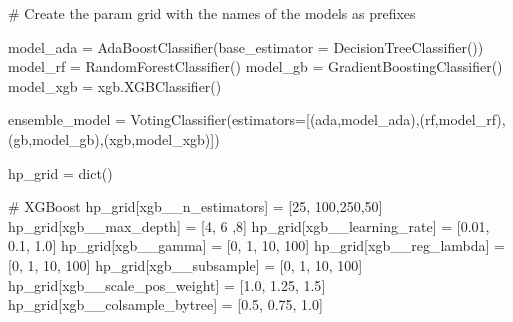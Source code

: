 \documentclass[
  letterpaper,
  DIV=11,
  numbers=noendperiod]{scrreprt}
\newenvironment{Shaded}{\begin{snugshade}}{\end{snugshade}}
\newcommand{\BuiltInTok}[1]{\textcolor[rgb]{0.00,0.23,0.31}{#1}}
\newcommand{\CommentTok}[1]{\textcolor[rgb]{0.37,0.37,0.37}{#1}}
\newcommand{\DecValTok}[1]{\textcolor[rgb]{0.68,0.00,0.00}{#1}}
\newcommand{\FloatTok}[1]{\textcolor[rgb]{0.68,0.00,0.00}{#1}}
\newcommand{\NormalTok}[1]{\textcolor[rgb]{0.00,0.23,0.31}{#1}}
\newcommand{\OperatorTok}[1]{\textcolor[rgb]{0.37,0.37,0.37}{#1}}
\newcommand{\StringTok}[1]{\textcolor[rgb]{0.13,0.47,0.30}{#1}}
\begin{document}
\begin{Shaded}
\begin{Highlighting}[]
\CommentTok{\# Create the param grid with the names of the models as prefixes}

\NormalTok{model\_ada }\OperatorTok{=}\NormalTok{ AdaBoostClassifier(base\_estimator }\OperatorTok{=}\NormalTok{ DecisionTreeClassifier())}
\NormalTok{model\_rf }\OperatorTok{=}\NormalTok{ RandomForestClassifier()}
\NormalTok{model\_gb }\OperatorTok{=}\NormalTok{ GradientBoostingClassifier()}
\NormalTok{model\_xgb }\OperatorTok{=}\NormalTok{ xgb.XGBClassifier()}

\NormalTok{ensemble\_model }\OperatorTok{=}\NormalTok{ VotingClassifier(estimators}\OperatorTok{=}\NormalTok{[(}\StringTok{\textquotesingle{}ada\textquotesingle{}}\NormalTok{,model\_ada),(}\StringTok{\textquotesingle{}rf\textquotesingle{}}\NormalTok{,model\_rf),(}\StringTok{\textquotesingle{}gb\textquotesingle{}}\NormalTok{,model\_gb),(}\StringTok{\textquotesingle{}xgb\textquotesingle{}}\NormalTok{,model\_xgb)])}

\NormalTok{hp\_grid }\OperatorTok{=} \BuiltInTok{dict}\NormalTok{()}

\CommentTok{\# XGBoost}
\NormalTok{hp\_grid[}\StringTok{\textquotesingle{}xgb\_\_n\_estimators\textquotesingle{}}\NormalTok{] }\OperatorTok{=}\NormalTok{ [}\DecValTok{25}\NormalTok{, }\DecValTok{100}\NormalTok{,}\DecValTok{250}\NormalTok{,}\DecValTok{50}\NormalTok{]}
\NormalTok{hp\_grid[}\StringTok{\textquotesingle{}xgb\_\_max\_depth\textquotesingle{}}\NormalTok{] }\OperatorTok{=}\NormalTok{ [}\DecValTok{4}\NormalTok{, }\DecValTok{6}\NormalTok{ ,}\DecValTok{8}\NormalTok{]}
\NormalTok{hp\_grid[}\StringTok{\textquotesingle{}xgb\_\_learning\_rate\textquotesingle{}}\NormalTok{] }\OperatorTok{=}\NormalTok{ [}\FloatTok{0.01}\NormalTok{, }\FloatTok{0.1}\NormalTok{, }\FloatTok{1.0}\NormalTok{]}
\NormalTok{hp\_grid[}\StringTok{\textquotesingle{}xgb\_\_gamma\textquotesingle{}}\NormalTok{] }\OperatorTok{=}\NormalTok{ [}\DecValTok{0}\NormalTok{, }\DecValTok{1}\NormalTok{, }\DecValTok{10}\NormalTok{, }\DecValTok{100}\NormalTok{]}
\NormalTok{hp\_grid[}\StringTok{\textquotesingle{}xgb\_\_reg\_lambda\textquotesingle{}}\NormalTok{] }\OperatorTok{=}\NormalTok{ [}\DecValTok{0}\NormalTok{, }\DecValTok{1}\NormalTok{, }\DecValTok{10}\NormalTok{, }\DecValTok{100}\NormalTok{]}
\NormalTok{hp\_grid[}\StringTok{\textquotesingle{}xgb\_\_subsample\textquotesingle{}}\NormalTok{] }\OperatorTok{=}\NormalTok{ [}\DecValTok{0}\NormalTok{, }\DecValTok{1}\NormalTok{, }\DecValTok{10}\NormalTok{, }\DecValTok{100}\NormalTok{]}
\NormalTok{hp\_grid[}\StringTok{\textquotesingle{}xgb\_\_scale\_pos\_weight\textquotesingle{}}\NormalTok{] }\OperatorTok{=}\NormalTok{ [}\FloatTok{1.0}\NormalTok{, }\FloatTok{1.25}\NormalTok{, }\FloatTok{1.5}\NormalTok{]}
\NormalTok{hp\_grid[}\StringTok{\textquotesingle{}xgb\_\_colsample\_bytree\textquotesingle{}}\NormalTok{] }\OperatorTok{=}\NormalTok{ [}\FloatTok{0.5}\NormalTok{, }\FloatTok{0.75}\NormalTok{, }\FloatTok{1.0}\NormalTok{]}


\end{Highlighting}
\end{Shaded}
\end{document}
